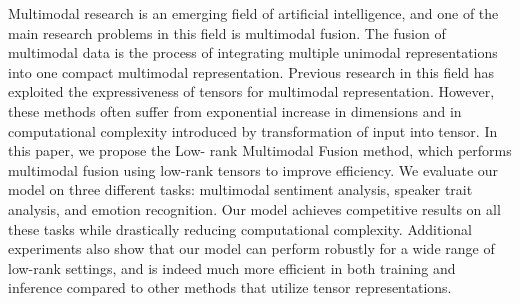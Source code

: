 Multimodal research is an emerging field of artificial intelligence, and one of the main research problems in this field is multimodal fusion. The fusion of multimodal data is the process of integrating multiple unimodal representations into one compact multimodal representation. Previous research in this field has exploited the expressiveness of tensors for multimodal representation. However, these methods often suffer from exponential increase in dimensions and in computational complexity introduced by transformation of input into tensor. In this paper, we propose the Low- rank Multimodal Fusion method, which performs multimodal fusion using low-rank tensors to improve efficiency. We evaluate our model on three different tasks: multimodal sentiment analysis, speaker trait analysis, and emotion recognition. Our model achieves competitive results on all these tasks while drastically reducing computational complexity. Additional experiments also show that our model can perform robustly for a wide range of low-rank settings, and is indeed much more efficient in both training and inference compared to other methods that utilize tensor representations.
